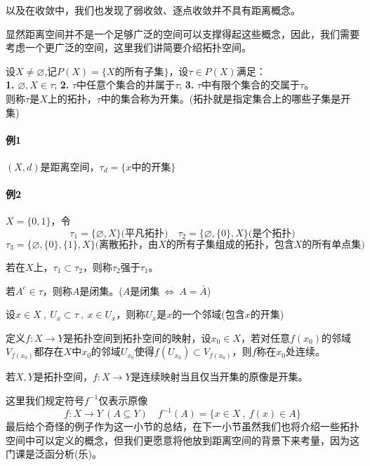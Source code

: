 以及在收敛中，我们也发现了弱收敛、逐点收敛并不具有距离概念。

显然距离空间并不是一个足够广泛的空间可以支撑得起这些概念，因此，我们需要考虑一个更广泛的空间，这里我们讲简要介绍拓扑空间。
\begin{definition}[拓扑]
    设$X \neq \varnothing$,记$P(X)=\{X\text{的所有子集}\}$，设$\tau \in P(X)$满足：\\
    \textbf{1.} $\varnothing,X \in \tau$; \qquad \textbf{2.} $\tau$中任意个集合的并属于$\tau$; \qquad \textbf{3.} $\tau$中有限个集合的交属于$\tau$。\\
    则称$\tau$是$X$上的拓扑，$\tau$中的集合称为开集。(拓扑就是指定集合上的哪些子集是开集)
\end{definition}
\paragraph*{例1} $(X,d)$是距离空间，$\tau_d=\{x\text{中的开集}\}$
\paragraph*{例2} $X=\{0,1\}$，令
\[\tau_1=\{\varnothing,X\}\text{(平凡拓扑)} \quad \tau_2=\{\varnothing,\{0\},X\}\text{(是个拓扑)}\]
\[\tau_3=\{\varnothing,\{0\},\{1\},X\}\text{(离散拓扑，由$X$的所有子集组成的拓扑，包含$X$的所有单点集)}\]

若在$X$上，$\tau_1 \subset \tau_2$，则称$\tau_2$强于$\tau_1$。
\begin{definition}[闭集]
    若$A^c \in \tau$，则称$A$是闭集。($A$是闭集$\ \Leftrightarrow \ A=\bar{A}$)
\end{definition}
\begin{definition}[邻域]
    设$x \in X \ , \ U_x \subset \tau \ , \ x \in U_x$，则称$U_x$是$x$的一个邻域(包含$x$的开集)
\end{definition}
\begin{definition}[连续]
    定义$f:X \to Y$是拓扑空间到拓扑空间的映射，设$x_0 \in X$，若对任意$f(x_0)$的邻域$V_{f(x_0)}$都存在$X$中$x_0$的邻域$U_{x_0}$使得$f(U_{x_0}) \subset V_{f(x_0)}$，则$f$称在$x_0$处连续。
\end{definition}
\begin{theorem}
    若$X,Y$是拓扑空间，$f:X \to Y$是连续映射当且仅当开集的原像是开集。
\end{theorem}
这里我们规定符号$f^{-1}$仅表示原像
\[f:X \to Y \ (A \subseteq Y) \quad f^{-1}(A)=\{x \in X \ , \ f(x) \in A\}\]
最后给个奇怪的例子作为这一小节的总结，在下一小节虽然我们也将介绍一些拓扑空间中可以定义的概念，但我们更愿意将他放到距离空间的背景下来考量，因为这门课是泛函分析(乐)。
